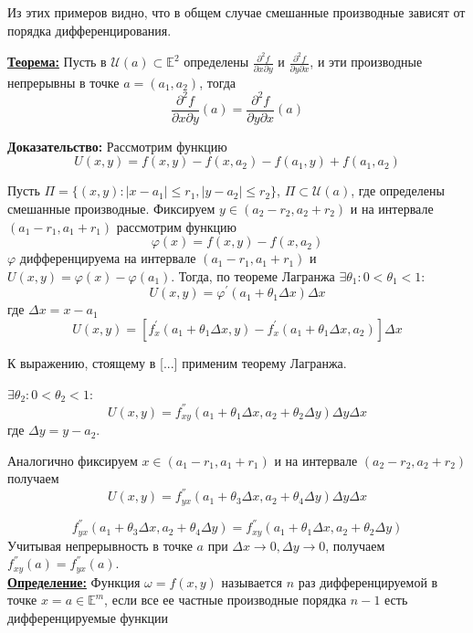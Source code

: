 \documentclass[a4paper,12pt]{article} %
\begin{document}
\begin{enumerate}
\end{enumerate}
	
Из этих примеров видно, что в общем случае смешанные производные зависят от порядка дифференцирования.
\vspace{5mm} 

\underline{\textbf{Теорема:}} Пусть в $\mathscr{U}(a) \subset \mathbb{E}^2$ определены $\frac{\partial^2f}{\partial x\partial y}$ и $\frac{\partial^2f}{\partial y\partial x}$, и эти производные непрерывны в точке $a = (a_1, a_2)$, тогда
\[
\frac{\partial^2f}{\partial{x}\partial{y}}(a) = \frac{\partial^2f}{\partial{y}\partial{x}}(a)
\]

\textbf{Доказательство:} Рассмотрим функцию
\[
	U(x, y) = f(x, y) - f(x, a_2) - f(a_1, y) + f(a_1, a_2)
\]

Пусть $\Pi = \{(x, y) : |x - a_1|\leqslant r_1, |y-a_2| \leqslant r_2\}$, $\Pi \subset \mathscr{U}(a)$, где определены смешанные производные. Фиксируем $y\in (a_2-r_2, a_2+r_2)$ и на интервале $(a_1-r_1, a_1+r_1)$ рассмотрим функцию 
\[
	\varphi(x) = f(x, y) - f(x, a_2)
\]
$\varphi$ дифференцируема на интервале $(a_1-r_1, a_1+r_1)$ и $U(x, y) = \varphi(x) - \varphi(a_1)$.
Тогда, по теореме Лагранжа $\exists \theta_1: 0<\theta_1<1$:
\[
	U(x, y) = \varphi^{'}(a_1 + \theta_1\Delta x)\Delta x
\]
где $\Delta x = x-a_1$
\[
	U(x, y) = [f^{'}_x(a_1+\theta_1\Delta x, y)-f^{'}_x(a_1+\theta_1\Delta x, a_2) ]\Delta x
\]

К выражению, стоящему в [...] применим теорему Лагранжа.

 $\exists\theta_2: 0<\theta_2<1$:
\[
	U(x, y) = f^{''}_{xy}(a_1+\theta_1\Delta x, a_2+\theta_2\Delta y)\Delta y\Delta x
\]
где $\Delta y = y-a_2$.
\vspace{5mm}

Аналогично фиксируем $x\in(a_1-r_1, a_1+r_1)$ и на интервале $(a_2-r_2, a_2+r_2)$ получаем
\[
	U(x, y) = f^{''}_{yx}(a_1+\theta_3\Delta x, a_2+\theta_4\Delta y)\Delta y\Delta x
\]

\[
	f^{''}_{yx}(a_1+\theta_3\Delta x, a_2+\theta_4\Delta y) = f^{''}_{xy}(a_1+\theta_1\Delta x, a_2+\theta_2\Delta y)
\]
Учитывая непрерывность в точке $a$ при $\Delta x\to0, \Delta y\to0$, получаем $f^{''}_{xy}(a) = f^{''}_{yx}(a)$.\\


\underline{\textbf{Определение:}} Функция $\omega = f(x, y)$ называется $n$ раз дифференцируемой в точке $x = a\in \mathbb{E}^m$, если все ее частные производные порядка $n-1$ есть дифференцируемые функции
\vspace{5mm}
\end{document}
